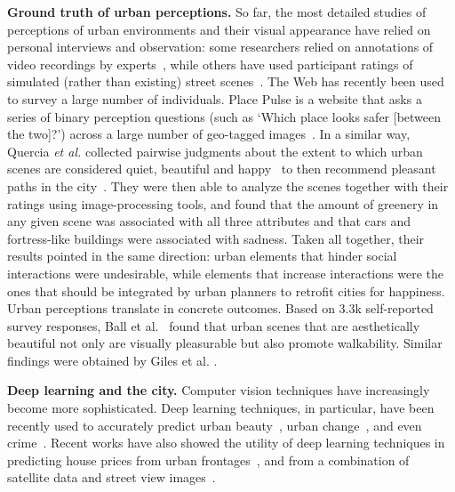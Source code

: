 \vspace{4pt}\noindent
\textbf{Ground truth of urban perceptions.} So far, the most detailed studies of perceptions of urban environments and their visual appearance have relied on personal interviews and  observation: some researchers relied on annotations of video recordings by experts~\cite{sampson04seeing}, while others have used participant ratings of simulated (rather than existing) street scenes~\cite{lindal2012}. The Web has recently been used to survey a large number of individuals. Place Pulse is a website that asks a series of binary perception questions (such as `Which place looks safer [between the two]?') across a large number of geo-tagged images~\cite{salesses2013collaborative}. In a similar way, Quercia \emph{et al.} collected pairwise judgments about the extent to which urban scenes are considered quiet, beautiful and happy~\cite{quercia2014aesthetic} to then recommend pleasant paths in the city~\cite{quercia2014shortest}. They were then able to analyze the scenes together with their ratings using image-processing tools, and found that the amount of greenery in any given scene was associated with all three attributes and that cars and fortress-like buildings were associated with sadness. Taken all together, their results pointed in the same direction: urban elements that hinder social interactions were undesirable, while elements that increase interactions were the ones that should be integrated by urban planners to retrofit cities for happiness. Urban perceptions translate in concrete outcomes. Based on 3.3k self-reported survey responses,  Ball et al.~\cite{ball2001perceived} found that urban scenes that are aesthetically beautiful not only are visually  pleasurable but also promote walkability. Similar findings were obtained by Giles et al. \cite{giles2005increasing}.

\vspace{4pt}\noindent
\textbf{Deep learning and the city.} Computer vision techniques have increasingly become more sophisticated. Deep learning techniques, in particular, have been recently used to accurately predict urban beauty~\cite{dubey2016deep,seresinhe2017using}, urban change~\cite{naik2017computer}, and even crime~\cite{DeNadai16,arietta2014city}.  Recent works have also showed the utility of deep learning techniques in predicting house prices from urban frontages~\cite{frontage}, and from a combination of satellite data and street view images~\cite{law2018take}.


